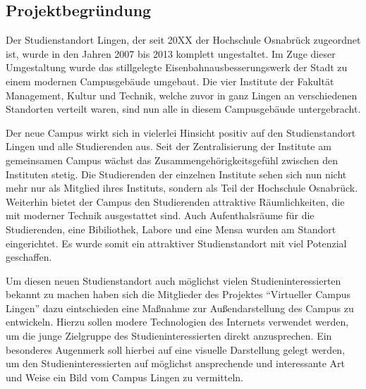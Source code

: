 \subsection{Projektbegründung}
\label{sec:Projektbegruendung}

Der Studienstandort Lingen, der seit 20XX der Hochschule Osnabrück zugeordnet
ist, wurde in den Jahren 2007 bis 2013 komplett ungestaltet. Im Zuge dieser
Umgestaltung wurde das stillgelegte Eisenbahnausbesserungswerk der Stadt zu
einem modernen Campusgebäude umgebaut. Die vier Institute der Fakultät
Management, Kultur und Technik, welche zuvor in ganz Lingen an verschiedenen
Standorten verteilt waren, sind nun alle in diesem Campusgebäude untergebracht.

Der neue Campus wirkt sich in vielerlei Hinsicht positiv auf den
Studienstandort Lingen und alle Studierenden aus. Seit der Zentralisierung der
Institute am gemeinsamen Campus wächst das Zusammengehörigkeitsgefühl zwischen
den Instituten stetig. Die Studierenden der einzelnen Institute sehen sich nun
nicht mehr nur als Mitglied ihres Instituts, sondern als Teil der Hochschule
Osnabrück. Weiterhin bietet der Campus den Studierenden attraktive
Räumlichkeiten, die mit moderner Technik ausgestattet sind. Auch Aufenthalsräume
für die Studierenden, eine Bibiliothek, Labore und eine Mensa wurden am Standort
eingerichtet. Es wurde somit ein attraktiver Studienstandort mit viel Potenzial
geschaffen.

Um diesen neuen Studienstandort auch möglichst vielen Studieninteressierten
bekannt zu machen haben sich die Mitglieder des Projektes "`Virtueller Campus
Lingen"' dazu eintschieden eine Maßnahme zur Außendarstellung des Campus zu
entwickeln. Hierzu sollen modere Technologien des Internets verwendet werden, um
die junge Zielgruppe des Studieninteressierten direkt anzusprechen. Ein
besonderes Augenmerk soll hierbei auf eine visuelle Darstellung gelegt werden,
um den Studieninteressierten auf möglichst ansprechende und interessante Art und
Weise ein Bild vom Campus Lingen zu vermitteln.

